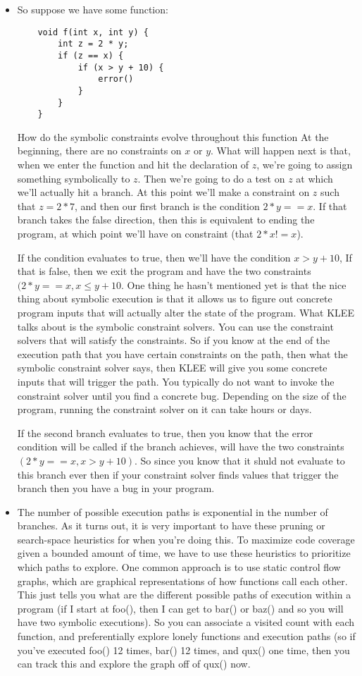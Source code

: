 \documentclass[12pt]{article}
\theoremstyle{definition}
\begin{document}
\begin{itemize}
    \item So suppose we have some function:
    \begin{lstlisting}
    void f(int x, int y) {
        int z = 2 * y;
        if (z == x) {
            if (x > y + 10) {
                error()
            }
        }
    }
    \end{lstlisting}
    How do the symbolic constraints evolve throughout this function At the beginning, there are no constraints on $x$ or $y$. What will happen next is that, when we enter the function and hit the declaration of $z$, we're going to assign something symbolically to $z$. Then we're going to do a test on $z$ at which we'll actually hit a branch. At this point we'll make a constraint on $z$ such that $z = 2 * 7$, and then our first branch is the condition $2 * y == x$. If that branch takes the false direction, then this is equivalent to ending the program, at which point we'll have on constraint (that $2 * x != x$).

    
    If the condition evaluates to true, then we'll have the condition $x > y + 10$, If that is false, then we exit the program and have the two constraints $(2 * y == x, x \le y + 10$. One thing he hasn't mentioned yet is that the nice thing about symbolic execution is that it allows us to figure out concrete program inputs that will actually alter the state of the program. What KLEE talks about is the symbolic constraint solvers. You can use the constraint solvers that will satisfy the constraints. So if you know at the end of the execution path that you have certain constraints on the path, then what the symbolic constraint solver says, then KLEE will give you some concrete inputs that will trigger the path. You typically do not want to invoke the constraint solver until you find a concrete bug. Depending on the size of the program, running the constraint solver on it can take hours or days.
    
    If the second branch evaluates to true, then you know that the error condition will be called if the branch achieves, will have the two constraints $(2 * y == x, x > y + 10)$. So since you know that it shuld not evaluate to this branch ever then if your constraint solver finds values that trigger the branch then you have a bug in your program.

    \item The number of possible execution paths is exponential in the number of branches. As it turns out, it is very important to have these pruning or search-space heuristics for when you're doing this. To maximize code coverage given a bounded amount of time, we have to use these heuristics to prioritize which paths to explore. One common approach is to use static control flow graphs, which are graphical representations of how functions call each other. This just tells you what are the different possible paths of execution within a program (if I start at foo(), then I can get to bar() or baz() and so you will have two symbolic executions). So you can associate a visited count with each function, and preferentially explore lonely functions and execution paths (so if you've executed foo() 12 times, bar() 12 times, and qux() one time, then you can track this and explore the graph off of qux() now.


\end{itemize}
\end{document}
